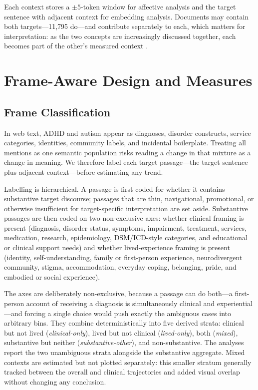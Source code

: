 \documentclass[final]{clv2025}
\begin{document}
Each context stores a $\pm5$-token window for affective analysis and the target sentence
with adjacent context for embedding analysis. Documents may contain both
targets---11{,}795 do---and contribute separately to each, which matters for
interpretation: as the two concepts are increasingly discussed together, each becomes part
of the other's measured context \citep{kangConvergingRepresentationsAttentionDeficit2025}.

\section{Frame-Aware Design and Measures}
\label{sec:design}

\subsection{Frame Classification}
\label{sec:frames}

In web text, ADHD and autism appear as diagnoses, disorder constructs, service categories,
identities, community labels, and incidental boilerplate. Treating all mentions as one
semantic population risks reading a change in that mixture as a change in meaning. We
therefore label each target passage---the target sentence plus adjacent context---before
estimating any trend.

Labelling is hierarchical. A passage is first coded for whether it contains substantive
target discourse; passages that are thin, navigational, promotional, or otherwise
insufficient for target-specific interpretation are set aside. Substantive passages are
then coded on two non-exclusive axes: whether clinical framing is present (diagnosis,
disorder status, symptoms, impairment, treatment, services, medication, research,
epidemiology, DSM/ICD-style categories, and educational or clinical support needs) and
whether lived-experience framing is present (identity, self-understanding, family or
first-person experience, neurodivergent community, stigma, accommodation, everyday coping,
belonging, pride, and embodied or social experience).

The axes are deliberately non-exclusive, because a passage can do both---a first-person
account of receiving a diagnosis is simultaneously clinical and experiential---and forcing
a single choice would push exactly the ambiguous cases into arbitrary bins. They combine
deterministically into five derived strata: clinical but not lived (\emph{clinical-only}),
lived but not clinical (\emph{lived-only}), both (\emph{mixed}), substantive but neither
(\emph{substantive-other}), and non-substantive. The analyses report the two unambiguous
strata alongside the substantive aggregate. Mixed contexts are estimated but not plotted
separately: this smaller stratum generally tracked between the overall and clinical
trajectories and added visual overlap without changing any conclusion.
\end{document}
